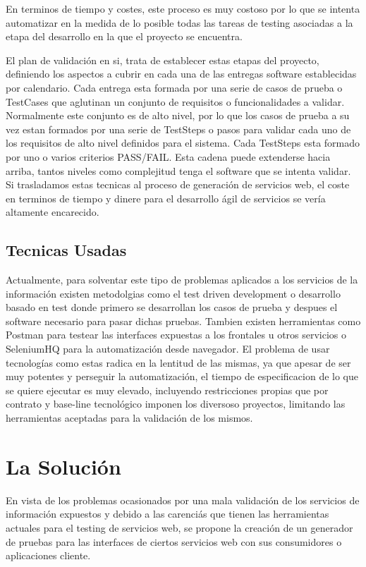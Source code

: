 \documentclass[a4paper,11pt]{book}
\begin{document}
En terminos de tiempo y costes, este proceso es muy costoso por lo que se intenta automatizar en la medida de lo posible todas las tareas de testing asociadas a la etapa del desarrollo en la que el proyecto se encuentra.

El plan de validación en si, trata de establecer estas etapas del proyecto, definiendo los aspectos a cubrir en cada una de las entregas software establecidas por calendario. Cada entrega esta formada por una serie de casos de prueba o TestCases que aglutinan un conjunto de requisitos o funcionalidades a validar. Normalmente este conjunto es de alto nivel, por lo que los casos de prueba a su vez estan formados por una serie de TestSteps o pasos para validar cada uno de los requisitos de alto nivel definidos para el sistema. Cada TestSteps esta formado por uno o varios criterios PASS/FAIL. Esta cadena puede extenderse hacia arriba, tantos niveles como complejitud tenga el software que se intenta validar. Si trasladamos estas tecnicas al proceso de generación de servicios web, el coste en terminos de tiempo y dinere para el desarrollo ágil de servicios se vería altamente encarecido.  

\section{Tecnicas Usadas}

Actualmente, para solventar este tipo de problemas aplicados a los servicios de la información existen metodolgias como el test driven development o desarrollo basado en test donde primero se desarrollan los casos de prueba y despues el software necesario para pasar dichas pruebas. Tambien existen herramientas como Postman\cite{postman} para testear las interfaces expuestas a los frontales u otros servicios o SeleniumHQ\cite{selenium} para la automatización desde navegador. El problema de usar tecnologías como estas radica en la lentitud de las mismas, ya que apesar de ser muy potentes y perseguir la automatización, el tiempo de especificacion de lo que se quiere ejecutar es muy elevado, incluyendo restricciones propias que por contrato y base-line tecnológico imponen los diversoso proyectos, limitando las herramientas aceptadas para la validación de los mismos. 
\chapter{La Solución}

En vista de los problemas ocasionados por una mala validación de los servicios de información expuestos y debido a las carenciás que tienen las herramientas actuales para el testing de servicios web, se propone la creación de un generador de pruebas para las interfaces de ciertos servicios web con sus consumidores o aplicaciones cliente. 
\end{document}
